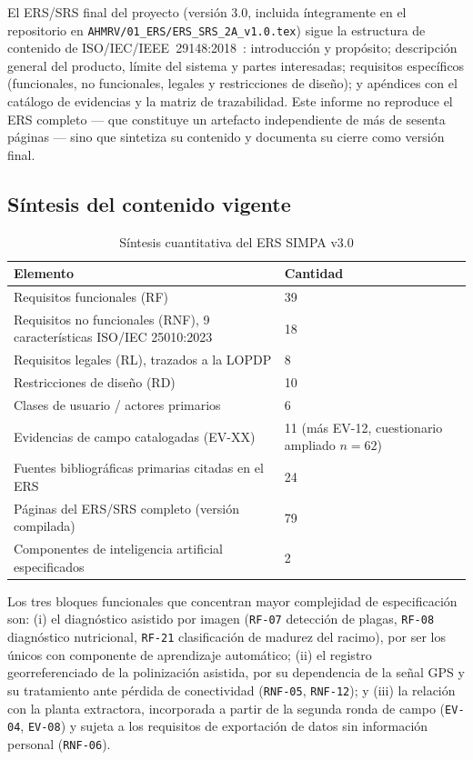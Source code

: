 \documentclass[11pt,a4paper]{article}
\newcommand{\id}[1]{\texttt{#1}}
\begin{document}
El ERS/SRS final del proyecto (versión 3.0, incluida íntegramente en el repositorio en
\id{AHMRV/01\_ERS/ERS\_SRS\_2A\_v1.0.tex}) sigue la estructura de contenido de
ISO/IEC/IEEE~29148:2018~\cite{iso29148}: introducción y propósito; descripción general del producto,
límite del sistema y partes interesadas; requisitos específicos (funcionales, no funcionales,
legales y restricciones de diseño); y apéndices con el catálogo de evidencias y la matriz de
trazabilidad. Este informe no reproduce el ERS completo --- que constituye un artefacto
independiente de más de sesenta páginas --- sino que sintetiza su contenido y documenta su cierre
como versión final.

\subsection{Síntesis del contenido vigente}

\begin{table}[!htbp]
\centering
\caption{Síntesis cuantitativa del ERS SIMPA v3.0}
\label{tab:sintesis-ers}
\begin{tabular}{|L{6.0cm}|C{3.0cm}|}
\hline
{}\textbf{Elemento} & \textbf{Cantidad} \\ \hline
Requisitos funcionales (RF) & 39 \\ \hline
Requisitos no funcionales (RNF), 9 características ISO/IEC 25010:2023 & 18 \\ \hline
Requisitos legales (RL), trazados a la LOPDP & 8 \\ \hline
Restricciones de diseño (RD) & 10 \\ \hline
Clases de usuario / actores primarios & 6 \\ \hline
Evidencias de campo catalogadas (EV-XX) & 11 (más EV-12, cuestionario ampliado $n=62$) \\ \hline
Fuentes bibliográficas primarias citadas en el ERS & 24 \\ \hline
Páginas del ERS/SRS completo (versión compilada) & 79 \\ \hline
Componentes de inteligencia artificial especificados & 2 \\ \hline
\end{tabular}
\end{table}

Los tres bloques funcionales que concentran mayor complejidad de especificación son: (i) el
diagnóstico asistido por imagen (\id{RF-07} detección de plagas, \id{RF-08} diagnóstico
nutricional, \id{RF-21} clasificación de madurez del racimo), por ser los únicos con componente de
aprendizaje automático; (ii) el registro georreferenciado de la polinización asistida, por su
dependencia de la señal GPS y su tratamiento ante pérdida de conectividad (\id{RNF-05},
\id{RNF-12}); y (iii) la relación con la planta extractora, incorporada a partir de la segunda
ronda de campo (\id{EV-04}, \id{EV-08}) y sujeta a los requisitos de exportación de datos sin
información personal (\id{RNF-06}).
\end{document}
